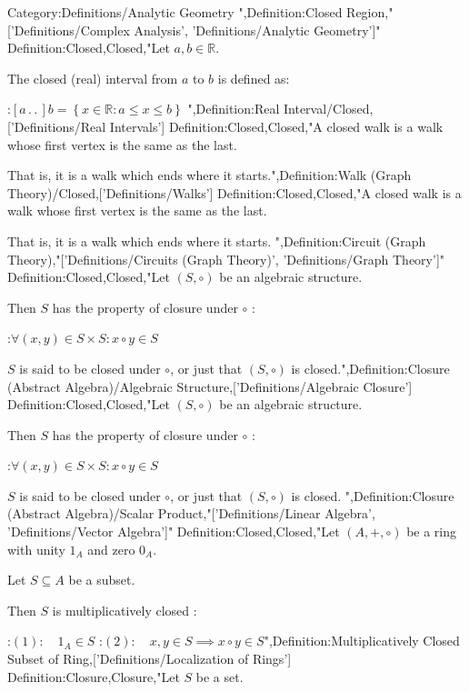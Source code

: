 Category:Definitions/Analytic Geometry
",Definition:Closed Region,"['Definitions/Complex Analysis', 'Definitions/Analytic Geometry']"
Definition:Closed,Closed,"Let $a, b \in \mathbb R$.

The closed (real) interval from $a$ to $b$ is defined as:

:$\left[ a \,.\,.\,   \right]b = \left\lbrace x \in \mathbb R: a \le x \le b \right\rbrace$
",Definition:Real Interval/Closed,['Definitions/Real Intervals']
Definition:Closed,Closed,"A closed walk is a walk whose first vertex is the same as the last.

That is, it is a walk which ends where it starts.",Definition:Walk (Graph Theory)/Closed,['Definitions/Walks']
Definition:Closed,Closed,"A closed walk is a walk whose first vertex is the same as the last.

That is, it is a walk which ends where it starts.
",Definition:Circuit (Graph Theory),"['Definitions/Circuits (Graph Theory)', 'Definitions/Graph Theory']"
Definition:Closed,Closed,"Let $\left( S, \circ \right)$ be an algebraic structure.


Then $S$ has the property of closure under $\circ$ :

:$\forall \left( x, y \right) \in S \times S: x \circ y \in S$


$S$ is said to be closed under $\circ$, or just that $\left( S, \circ \right)$ is closed.",Definition:Closure (Abstract Algebra)/Algebraic Structure,['Definitions/Algebraic Closure']
Definition:Closed,Closed,"Let $\left( S, \circ \right)$ be an algebraic structure.


Then $S$ has the property of closure under $\circ$ :

:$\forall \left( x, y \right) \in S \times S: x \circ y \in S$


$S$ is said to be closed under $\circ$, or just that $\left( S, \circ \right)$ is closed.
",Definition:Closure (Abstract Algebra)/Scalar Product,"['Definitions/Linear Algebra', 'Definitions/Vector Algebra']"
Definition:Closed,Closed,"Let $\left( A, +, \circ \right)$ be a ring with unity $1_A$ and zero $0_A$.

Let $S \subseteq A$ be a subset.


Then $S$ is multiplicatively closed :

:$(1): \quad 1_A \in S$
:$(2): \quad x, y \in S \implies x \circ y \in S$",Definition:Multiplicatively Closed Subset of Ring,['Definitions/Localization of Rings']
Definition:Closure,Closure,"Let $S$ be a set.

